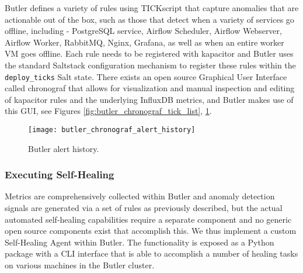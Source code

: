 Butler defines a variety of rules using TICKscript that capture anomalies that are actionable out of the box, such as those that detect when a variety of services go offline, including - PostgreSQL service, Airflow Scheduler, Airflow Webserver, Airflow Worker, RabbitMQ, Nginx, Grafana, as well as when an entire worker VM goes offline. Each rule needs to be registered with kapacitor and Butler uses the standard Saltstack configuration mechanism to register these rules within the \texttt{deploy_ticks} Salt state. There exists an open source Graphical User Interface called chronograf\autocite{chronograf} that allows for visualization and manual inspection and editing of kapacitor rules and the underlying InfluxDB metrics, and Butler makes use of this GUI, see Figures \ref{fig:butler_chronograf_tick_list}, \ref{fig:butler_chronograf_alert_history}.

\begin{figure}[h]
    \texttt{[image: butler\_chronograf\_alert\_history]}
    \centering
    \caption {Butler alert history.}
    \label{fig:butler_chronograf_alert_history}
\end{figure} 

\subsubsection{Executing Self-Healing}

Metrics are comprehensively collected within Butler and anomaly detection signals are generated via a set of rules as previously described, but the actual automated self-healing capabilities require a separate component and no generic open source components exist that accomplish this. We thus implement a custom Self-Healing Agent within Butler. The functionality is exposed as a Python package with a CLI interface that is able to accomplish a number of healing tasks on various machines in the Butler cluster.

